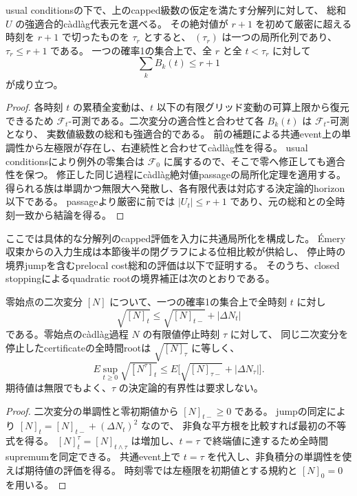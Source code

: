 \begin{lemma}[具体的な分解列の共通passage]
usual conditionsの下で、上のcapped級数の仮定を満たす分解列に対して、
総和 $U$ の強適合的c\`adl\`ag代表元を選べる。
その絶対値が $r+1$ を初めて厳密に超える時刻を $r+1$ で切ったものを $\tau_r$ とすると、
$(\tau_r)$ は一つの局所化列であり、$\tau_r\le r+1$ である。
一つの確率1の集合上で、全 $r$ と全 $t<\tau_r$ に対して
\[
 \sum_k B_k(t)\le r+1
\]
が成り立つ。
\end{lemma}
\begin{proof}
各時刻 $t$ の累積全変動は、$t$ 以下の有限グリッド変動の可算上限から復元できるため
$\mathcal F_t$-可測である。二次変分の適合性と合わせて各 $B_k(t)$ は $\mathcal F_t$-可測となり、
実数値級数の総和も強適合的である。
前の補題による共通event上の単調性から左極限が存在し、右連続性と合わせてc\`adl\`ag性を得る。
usual conditionsにより例外の零集合は $\mathcal F_0$ に属するので、そこで零へ修正しても適合性を保つ。
修正した同じ過程にc\`adl\`ag絶対値passageの局所化定理を適用する。
得られる族は単調かつ無限大へ発散し、各有限代表は対応する決定論的horizon以下である。
passageより厳密に前では $|U_t|\le r+1$ であり、元の総和との全時刻一致から結論を得る。
\end{proof}
ここでは具体的な分解列のcapped評価を入力に共通局所化を構成した。
Émery収束からの入力生成は本節後半の閉グラフによる位相比較が供給し、
停止時の境界jumpを含むprelocal cost総和の評価は以下で証明する。
そのうち、closed stoppingによるquadratic rootの境界補正は次のとおりである。

\begin{lemma}
零始点の二次変分 $[N]$ について、一つの確率1の集合上で全時刻 $t$ に対し
\[
 \sqrt{[N]_t}\le\sqrt{[N]_{t-}}+|\Delta N_t|
\]
である。零始点のc\`adl\`ag過程 $N$ の有限値停止時刻 $\tau$ に対して、
同じ二次変分を停止したcertificateの全時間rootは $\sqrt{[N]_\tau}$ に等しく、
\[
 E\sup_{t\ge0}\sqrt{[N^\tau]_t}
 \le E\bigl[\sqrt{[N]_{\tau-}}+|\Delta N_\tau|\bigr].
\]
期待値は無限でもよく、$\tau$ の決定論的有界性は要求しない。
\end{lemma}
\begin{proof}
二次変分の単調性と零初期値から $[N]_{t-}\ge0$ である。
jumpの同定により $[N]_t=[N]_{t-}+(\Delta N_t)^2$ なので、
非負な平方根を比較すれば最初の不等式を得る。
$[N]^\tau_t=[N]_{t\wedge\tau}$ は増加し、$t=\tau$ で終端値に達するため全時間supremumを同定できる。
共通event上で $t=\tau$ を代入し、非負積分の単調性を使えば期待値の評価を得る。
時刻零では左極限を初期値とする規約と $[N]_0=0$ を用いる。
\end{proof}

